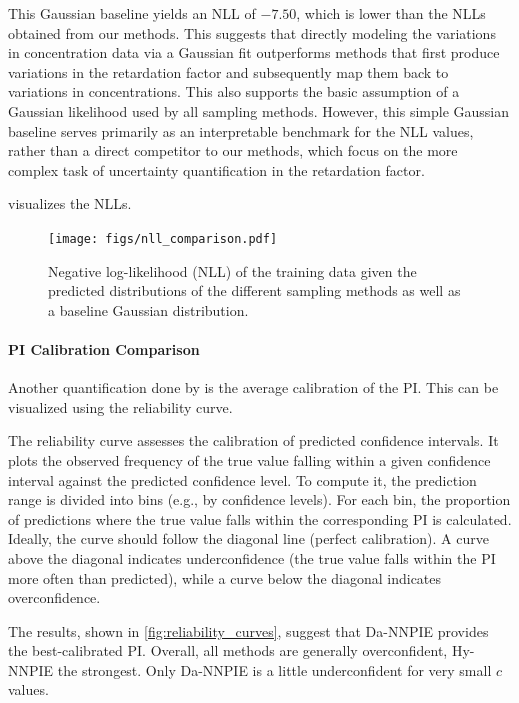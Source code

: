 This Gaussian baseline yields an NLL of $-7.50$, which is lower than the NLLs obtained from our methods. This suggests that directly modeling the variations in concentration data via a Gaussian fit outperforms methods that first produce variations in the retardation factor and subsequently map them back to variations in concentrations. This also supports the basic assumption of a Gaussian likelihood used by all sampling methods. However, this simple Gaussian baseline serves primarily as an interpretable benchmark for the NLL values, rather than a direct competitor to our methods, which focus on the more complex task of uncertainty quantification in the retardation factor.


 visualizes the NLLs.

\begin{figure}[h]
    \centering
    \texttt{[image: figs/nll\_comparison.pdf]}
    \caption{Negative log-likelihood (NLL) of the training data given the predicted distributions of the different sampling methods as well as a baseline Gaussian distribution.}
    \label{fig:nll_comparison}
\end{figure}


\paragraph{PI Calibration Comparison}
Another quantification done by \cite{finn} is the average calibration of the PI. This can be visualized using the reliability curve.

The reliability curve assesses the calibration of predicted confidence intervals. It plots the observed frequency of the true value falling within a given confidence interval against the predicted confidence level. To compute it, the prediction range is divided into bins (e.g., by confidence levels). For each bin, the proportion of predictions where the true value falls within the corresponding PI is calculated. Ideally, the curve should follow the diagonal line (perfect calibration). A curve above the diagonal indicates underconfidence (the true value falls within the PI more often than predicted), while a curve below the diagonal indicates overconfidence.

The results, shown in \cref{fig:reliability_curves}, suggest that Da-NNPIE provides the best-calibrated PI. Overall, all methods are generally overconfident, Hy-NNPIE the strongest. Only Da-NNPIE is a little underconfident for very small $c$ values.

